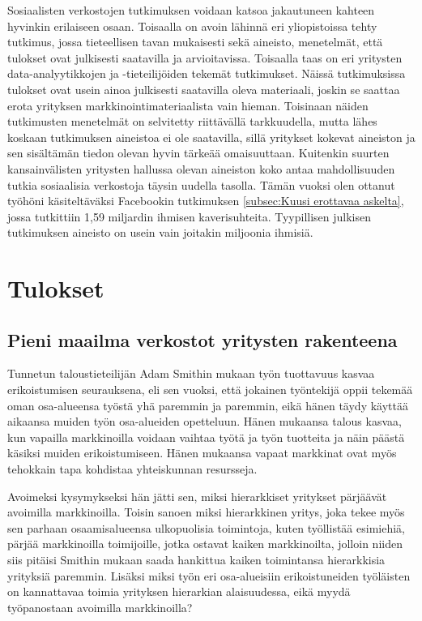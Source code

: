 \documentclass[finnish,12pt,a4paper,pdftex,elec,utf8]{aaltothesis}
\begin{document}
Sosiaalisten verkostojen tutkimuksen voidaan katsoa jakautuneen kahteen hyvinkin erilaiseen osaan. Toisaalla on avoin lähinnä eri yliopistoissa tehty tutkimus, jossa tieteellisen tavan mukaisesti sekä aineisto, menetelmät, että tulokset ovat julkisesti saatavilla ja arvioitavissa. Toisaalla taas on eri yritysten data-analyytikkojen ja -tieteilijöiden tekemät tutkimukset. Näissä tutkimuksissa tulokset ovat usein ainoa julkisesti saatavilla oleva materiaali, joskin se saattaa erota yrityksen markkinointimateriaalista vain hieman. Toisinaan näiden tutkimusten menetelmät on selvitetty riittävällä tarkkuudella, mutta lähes koskaan tutkimuksen aineistoa ei ole saatavilla, sillä yritykset kokevat aineiston ja sen sisältämän tiedon olevan hyvin tärkeää omaisuuttaan. Kuitenkin suurten kansainvälisten yritysten hallussa olevan aineiston koko antaa mahdollisuuden tutkia sosiaalisia verkostoja täysin uudella tasolla. Tämän vuoksi olen ottanut työhöni käsiteltäväksi Facebookin tutkimuksen \ref{subsec:Kuusi erottavaa askelta}, jossa tutkittiin 1,59 miljardin ihmisen kaverisuhteita. Tyypillisen julkisen tutkimuksen aineisto on usein vain joitakin miljoonia ihmisiä.

\clearpage
\section{Tulokset}


\subsection{Pieni maailma verkostot yritysten rakenteena}

Tunnetun taloustieteilijän Adam Smithin mukaan työn tuottavuus kasvaa erikoistumisen seurauksena, eli sen vuoksi, että jokainen työntekijä oppii tekemää oman osa-alueensa työstä yhä paremmin ja paremmin, eikä hänen täydy käyttää aikaansa muiden työn osa-alueiden opetteluun. Hänen mukaansa talous kasvaa, kun vapailla markkinoilla voidaan vaihtaa työtä ja työn tuotteita ja näin päästä käsiksi muiden erikoistumiseen. Hänen mukaansa vapaat markkinat ovat myös tehokkain tapa kohdistaa yhteiskunnan resursseja. \cite{Kansojen-Varallisuus}

Avoimeksi kysymykseksi hän jätti sen, miksi hierarkkiset yritykset pärjäävät avoimilla markkinoilla. Toisin sanoen miksi hierarkkinen yritys, joka tekee myös sen parhaan osaamisalueensa ulkopuolisia toimintoja, kuten työllistää esimiehiä, pärjää markkinoilla toimijoille, jotka ostavat kaiken markkinoilta, jolloin niiden siis pitäisi Smithin mukaan saada hankittua kaiken toimintansa hierarkkisia yrityksiä paremmin. Lisäksi miksi työn eri osa-alueisiin erikoistuneiden työläisten on kannattavaa toimia yrityksen hierarkian alaisuudessa, eikä myydä työpanostaan avoimilla markkinoilla?
\end{document}
